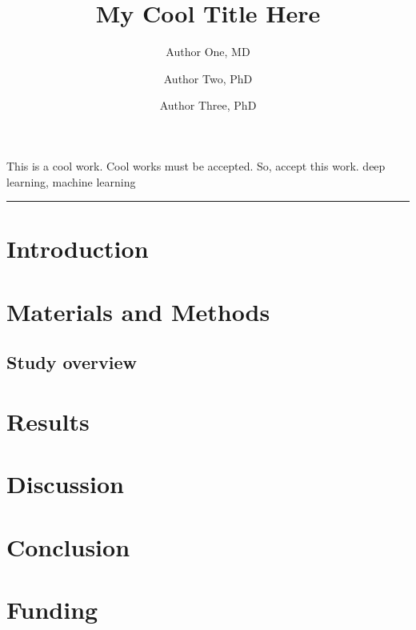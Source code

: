 \documentclass[twoside, 8pt]{article}
\title{My Cool Title Here}
\author[1, 2]{Author One, MD}
\author[2]{Author Two, PhD}
\author[1]{Author Three, PhD}
\affil[1]{Institution One, Country;}
\affil[2]{Institution Two, Country}
\date{}
\begin{document}
\maketitle

\small
\abstractSection
{This is a cool work. Cool works must be accepted. So, accept this work.} %
{\lipsum[1]} %
{\lipsum[2]} %
{\lipsum[3]} %
{\lipsum[4]} %
{deep learning, machine learning} %

\par\noindent\rule[-7pt]{15.5cm}{0.2em}
\vspace{0.2cm}

\begin{multicols*}{2}

\section*{Introduction}
\lipsum[3-4] \cite{he2016deep}

\section*{Materials and Methods}
\subsection*{Study overview}
\lipsum[3-4]

\section*{Results}
\lipsum[3-4]

\section*{Discussion}
\lipsum[3-4]

\section*{Conclusion}
\lipsum[3-4]

\section*{Funding}
\lipsum[3-4]




\end{multicols*}
\end{document}
